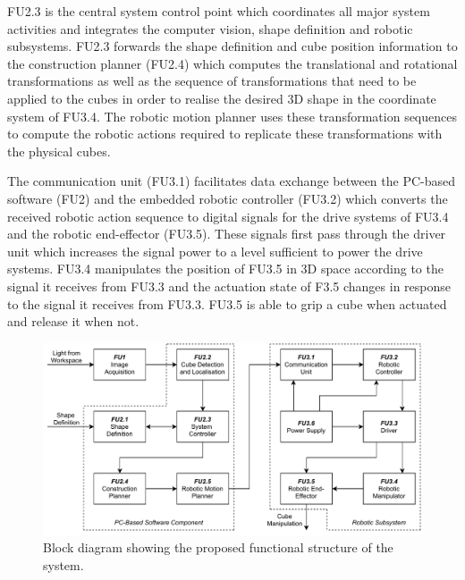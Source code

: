 FU2.3 is the central system control point which coordinates all major system activities and integrates the computer vision, shape definition and robotic subsystems. FU2.3 forwards the shape definition and cube position information to the construction planner (FU2.4) which computes the translational and rotational transformations as well as the sequence of transformations that need to be applied to the cubes in order to realise the desired 3D shape in the coordinate system of FU3.4. The robotic motion planner uses these transformation sequences to compute the robotic actions required to replicate these transformations with the physical cubes.
 
The communication unit (FU3.1) facilitates data exchange between the PC-based software (FU2) and the embedded robotic controller (FU3.2) which converts the received robotic action sequence to digital signals for the drive systems of FU3.4 and the robotic end-effector (FU3.5). These signals first pass through the driver unit which increases the signal power to a level sufficient to power the drive systems. FU3.4 manipulates the position of FU3.5 in 3D space according to the signal it receives from FU3.3 and the actuation state of F3.5 changes in response to the signal it receives from FU3.3. FU3.5 is able to grip a cube when actuated and release it when not.

\begin{figure}[H]
  \centering
  \includegraphics[width=0.8\linewidth]{figures/functional-block-diagram.pdf}
  \caption{Block diagram showing the proposed functional structure of the system.}
  \label{fig:functional_block_diagram}
\end{figure}

\pendsign